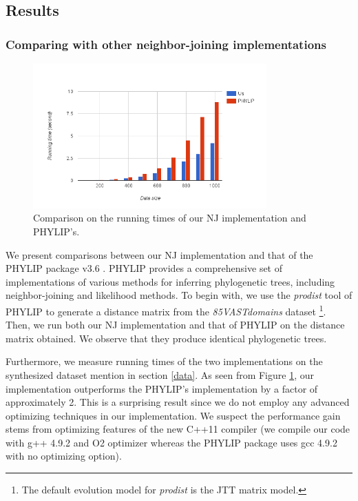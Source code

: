 \documentclass[11pt,letterpaper]{article}
\theoremstyle{definition}
\begin{document}
\subsection{Results}

\subsubsection{Comparing with other neighbor-joining implementations}

\begin{figure}[t]
  \centering
  \includegraphics[width=0.8\textwidth]{runningtime.png}
  \caption{Comparison on the running times of our NJ implementation and PHYLIP's.}
  \label{fig:runningtime}
\end{figure}


We present comparisons between our NJ implementation and that of the PHYLIP package v3.6 \cite{felsenstein2005phylip}. PHYLIP provides a comprehensive set of implementations of various methods for inferring phylogenetic trees, including neighbor-joining and likelihood methods. To begin with, we use the \textit{prodist} tool of PHYLIP to generate a distance matrix from the \textit{85VASTdomains} dataset \footnote{The default evolution model for \textit{prodist} is the JTT matrix model.}. Then, we run both our NJ implementation and that of PHYLIP on the distance matrix obtained. We observe that they produce identical phylogenetic trees. 

Furthermore, we measure running times of the two implementations on the synthesized dataset mention in section \ref{data}. As seen from Figure \ref{fig:runningtime}, our implementation outperforms the PHYLIP's implementation by a factor of approximately 2. This is a surprising result since we do not employ any advanced optimizing techniques in our implementation. We suspect the performance gain stems from optimizing features of the new C++11 compiler (we compile our code with g++ 4.9.2 and O2 optimizer whereas the PHYLIP package uses gcc 4.9.2 with no optimizing option).  
\end{document}
